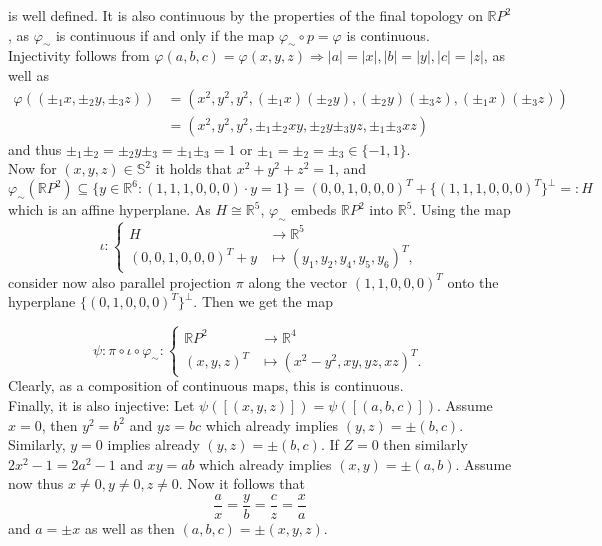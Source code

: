 \documentclass[11pt]{article}
\begin{document}
is well defined. It is also continuous by the properties of the final topology on $\mathbb R P^2$, as $\varphi_\sim$ is continuous if and only if the map $\varphi_\sim\circ p = \varphi$ is continuous.
\\
Injectivity follows from $\varphi(a,b,c) = \varphi(x,y,z)\Rightarrow |a| = |x|, |b| = |y|, |c| = |z|$, as well as 
\begin{align*}
     \varphi((\pm_1 x,\pm_2 y,\pm_3 z)) &= (x^2,y^2,y^2, (\pm_1x)(\pm_2y), (\pm_2y)(\pm_3z), (\pm_1x)(\pm_3z)) \\&= (x^2,y^2,y^2, \pm_1\pm_2xy, \pm_2y\pm_3yz, \pm_1\pm_3xz)
\end{align*} and thus $\pm_1\pm_2 = \pm_2y\pm_3 = \pm_1\pm_3 = 1$ or $\pm_1 = \pm_2 = \pm_3\in \{-1,1\}$.
\\
Now for $(x,y,z)\in \mathbb S^2$ it holds that $x^2+y^2+z^2 = 1$, and $$\varphi_\sim(\mathbb RP^2)\subseteq\{y\in \mathbb R^6: (1,1,1,0,0,0)\cdot y = 1\} = (0,0,1,0,0,0)^T + \{(1,1,1,0,0,0)^T\}^\perp=:H$$ which is an affine hyperplane. As $H\cong\mathbb R^5$, $\varphi_\sim$ embeds   $\mathbb R P^2$ into $\mathbb R^5$. Using the map \begin{equation*}
    \iota: 
        \begin{cases}
            H&\to \mathbb R^5\\
            (0,0,1,0,0,0)^T + y&\mapsto (y_1,y_2, y_4,y_5,y_6)^T,
        \end{cases}
\end{equation*} consider now also parallel projection $\pi$ along the vector $(1,1,0,0,0)^T$ onto the hyperplane $\{(0,1,0,0,0)^T\}^\perp$. Then we get the map 

$$
\psi: \pi\circ \iota\circ\varphi_\sim:\begin{cases}
    \mathbb RP^2&\to \mathbb R^4\\
    (x,y,z)^T&\mapsto (x^2-y^2, xy,yz,xz)^T.
\end{cases}$$
Clearly, as a composition of continuous maps, this is continuous. 
\\
Finally, it is also injective: Let $\psi([(x,y,z)]) = \psi([(a,b,c)])$. Assume $x=0$, then $y^2 = b^2$ and $yz = bc$ which already implies $(y,z) = \pm (b,c)$. Similarly, $y= 0$ implies already  $(y,z) = \pm (b,c)$. If $Z=0$ then similarly $2x^2-1 = 2a^2-1$ and $xy = ab$ which already implies $(x,y)= \pm (a,b)$. Assume now thus $x\neq 0, y\neq 0, z \neq 0$. Now it follows that \begin{equation*}
    \frac ax = \frac yb = \frac cz = \frac xa
    \end{equation*}
    and $a = \pm x$ as well as then $(a,b,c) = \pm (x,y,z)$.









\end{document}
